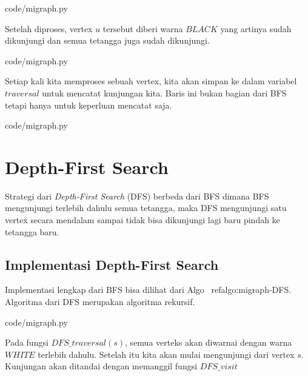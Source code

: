 
                {code/migraph.py}

Setelah diproses, vertex $u$ tersebut diberi warna $BLACK$ yang artinya sudah dikunjungi dan semua tetangga juga sudah dikunjungi.


                {code/migraph.py}
								
Setiap kali kita memproses sebuah vertex, kita akan simpan ke dalam variabel $traversal$ untuk mencatat kunjungan kita. Baris ini bukan bagian dari BFS tetapi hanya untuk keperluan mencatat saja.


                {code/migraph.py}
								
\section{Depth-First Search}

Strategi dari \textit{Depth-First Search} (DFS) berbeda dari BFS dimana BFS mengunjungi terlebih dahulu semua tetangga, maka DFS mengunjungi satu vertex secara mendalam sampai tidak bisa dikunjungi lagi baru pindah ke tetangga baru. 

\subsection{Implementasi Depth-First Search}

Implementasi lengkap dari BFS bisa dilihat dari Algo ~ref{algo:migraph-DFS}. Algoritma dari DFS merupakan algoritma rekursif.


                {code/migraph.py}

Pada fungsi $DFS\_traversal(s)$, semua verteks akan diwarnai dengan warna $WHITE$ terlebih dahulu. Setelah itu kita akan mulai mengunjungi dari vertex $s$. Kunjungan akan ditandai dengan memanggil fungsi $DFS\_visit$

